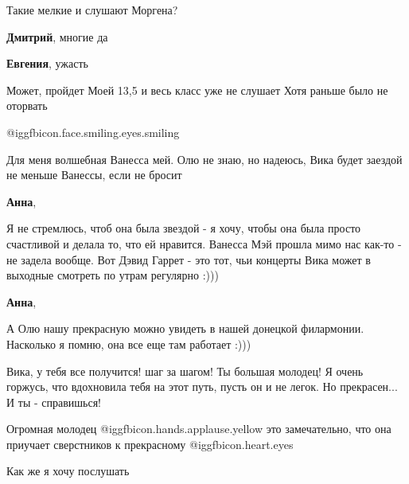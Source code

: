  
 
 
 
 
\zzSecCmt

\begin{itemize} %
Такие мелкие и слушают Моргена?

\begin{itemize} %
\textbf{Дмитрий}, многие да

\textbf{Евгения}, ужасть

Может, пройдет
Моей 13,5 и весь класс уже не слушает
Хотя раньше было не оторвать
\end{itemize} %

 @igg{fbicon.face.smiling.eyes.smiling} 


Для меня волшебная Ванесса мей.  Олю не знаю, но надеюсь, Вика будет заездой не
меньше Ванессы, если не бросит

\begin{itemize} %
\textbf{Анна}, 

Я не стремлюсь, чтоб она была звездой - я хочу, чтобы она была просто
счастливой и делала то, что ей нравится. Ванесса Мэй прошла мимо нас как-то -
не задела вообще. Вот Дэвид Гаррет - это тот, чьи концерты Вика может в
выходные смотреть по утрам регулярно :)))

\textbf{Анна}, 

А Олю нашу прекрасную можно увидеть в нашей донецкой филармонии. Насколько я
помню, она все еще там работает :)))

\end{itemize} %


Вика, у тебя все получится! шаг за шагом! Ты большая молодец! Я очень горжусь,
что вдохновила тебя на этот путь, пусть он и не легок. Но прекрасен... И ты -
справишься!


Огромная молодец @igg{fbicon.hands.applause.yellow}  это замечательно, что она
приучает сверстников к прекрасному @igg{fbicon.heart.eyes} 

Как же я хочу послушать

\end{itemize} %
